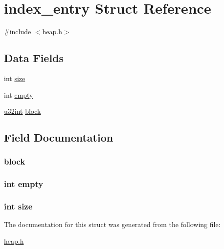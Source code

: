 \hypertarget{structindex__entry}{}\section{index\+\_\+entry Struct Reference}
\label{structindex__entry}


{\ttfamily \#include $<$heap.\+h$>$}

\subsection*{Data Fields}
\begin{DoxyCompactItemize}
\item 
int \hyperlink{structindex__entry_a439227feff9d7f55384e8780cfc2eb82}{size}
\item 
int \hyperlink{structindex__entry_a7d076984670ab0600048b27ffb9ccdc3}{empty}
\item 
\hyperlink{system_8h_a757de76cafbcddaac0d1632902fe4cb8}{u32int} \hyperlink{structindex__entry_a149bb6ecda94461da44658b57b575133}{block}
\end{DoxyCompactItemize}


\subsection{Field Documentation}
\hypertarget{structindex__entry_a149bb6ecda94461da44658b57b575133}{}
\subsubsection[{block}]{ block}\label{structindex__entry_a149bb6ecda94461da44658b57b575133}
\hypertarget{structindex__entry_a7d076984670ab0600048b27ffb9ccdc3}{}
\subsubsection[{empty}]{\setlength{\rightskip}{0pt plus 5cm}int empty}\label{structindex__entry_a7d076984670ab0600048b27ffb9ccdc3}
\hypertarget{structindex__entry_a439227feff9d7f55384e8780cfc2eb82}{}
\subsubsection[{size}]{\setlength{\rightskip}{0pt plus 5cm}int size}\label{structindex__entry_a439227feff9d7f55384e8780cfc2eb82}


The documentation for this struct was generated from the following file\+:\begin{DoxyCompactItemize}
\item 
\hyperlink{heap_8h}{heap.\+h}\end{DoxyCompactItemize}
